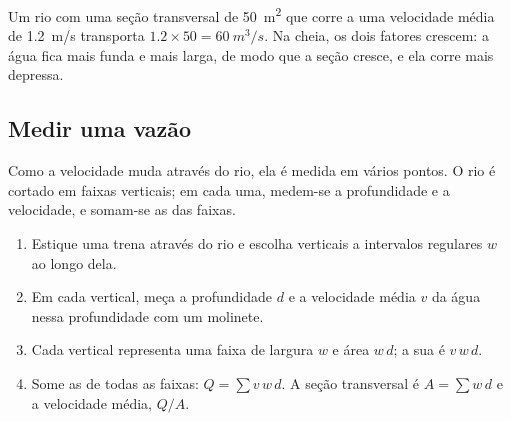 Um rio com uma seção transversal de \qty{50}{m^2} que corre a uma velocidade
média de \qty{1.2}{m/s} transporta $1.2 \times 50 = \qty{60}{m^3/s}$. Na
cheia, os dois fatores crescem: a água fica mais funda e mais larga, de modo
que a seção cresce, e ela corre mais depressa.

\subsection*{Medir uma vazão}

Como a velocidade muda através do rio, ela é medida em vários pontos. O rio
é cortado em faixas verticais; em cada uma, medem-se a profundidade e a
velocidade, e somam-se as  das faixas.

\begin{method}\label{met:g10:drainage-basins:velocity-area}
\begin{enumerate}
  \item Estique uma trena através do rio e escolha verticais a intervalos
        regulares $w$ ao longo dela.
  \item Em cada vertical, meça a profundidade $d$ e a velocidade média $v$
        da água nessa profundidade com um molinete.
  \item Cada vertical representa uma faixa de largura $w$ e área $w\,d$; a
        sua  é $v\,w\,d$.
  \item Some as  de todas as faixas: $Q = \sum v\,w\,d$.
        A seção transversal é $A = \sum w\,d$ e a velocidade média, $Q/A$.
\end{enumerate}
\end{method}

